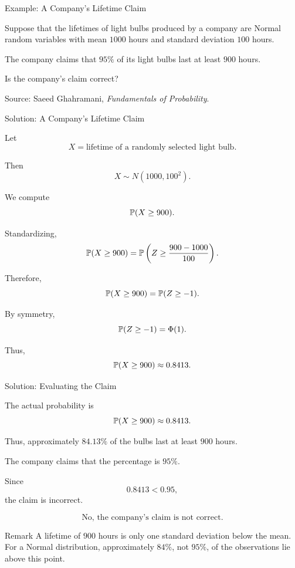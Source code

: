 

\begin{frame}{Example: A Company's Lifetime Claim}

Suppose that the lifetimes of light bulbs produced by a company are Normal
random variables with mean \(1000\) hours and standard deviation \(100\)
hours.

The company claims that \(95\%\) of its light bulbs last at least \(900\)
hours.

Is the company's claim correct?

\vfill

{\scriptsize
Source: Saeed Ghahramani, \emph{Fundamentals of Probability}.
}

\end{frame}


\begin{frame}{Solution: A Company's Lifetime Claim}

Let
\[
X=\text{lifetime of a randomly selected light bulb}.
\]

Then
\[
X\sim N(1000,100^2).
\]

We compute
\[
\mathbb{P}(X\geq900).
\]

Standardizing,
\[
\mathbb{P}(X\geq900)
=
\mathbb{P}\left(
Z\geq
\frac{900-1000}{100}
\right).
\]

Therefore,
\[
\mathbb{P}(X\geq900)
=
\mathbb{P}(Z\geq-1).
\]

By symmetry,
\[
\mathbb{P}(Z\geq-1)=\Phi(1).
\]

Thus,
\[
\mathbb{P}(X\geq900)
\approx0.8413.
\]

\end{frame}


\begin{frame}{Solution: Evaluating the Claim}

The actual probability is
\[
\mathbb{P}(X\geq900)\approx0.8413.
\]

Thus, approximately \(84.13\%\) of the bulbs last at least \(900\) hours.

The company claims that the percentage is \(95\%\).

Since
\[
0.8413<0.95,
\]
the claim is incorrect.

\[
\boxed{\text{No, the company's claim is not correct.}}
\]

\begin{keybox}{Remark}
A lifetime of \(900\) hours is only one standard deviation below the mean.
For a Normal distribution, approximately \(84\%\), not \(95\%\), of the
observations lie above this point.
\end{keybox}

\end{frame}


